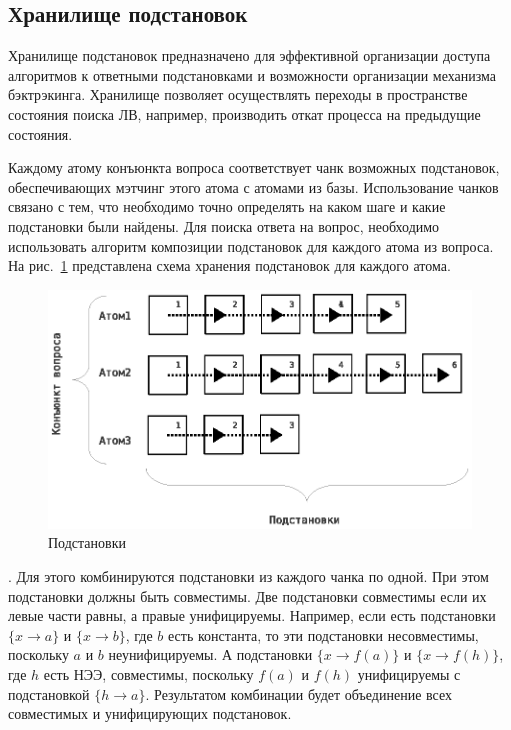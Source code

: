 \subsection{Хранилище подстановок}
Хранилище подстановок предназначено для эффективной организации доступа алгоритмов к ответными подстановками и возможности организации механизма бэктрэкинга. Хранилище позволяет осуществлять переходы в пространстве состояния поиска ЛВ, например, производить откат процесса на предыдущие состояния.

Каждому атому конъюнкта вопроса соответствует чанк возможных подстановок, обеспечивающих мэтчинг этого атома с атомами из базы. Использование чанков связано с тем, что необходимо точно определять на каком шаге и какие подстановки были найдены. Для поиска ответа на вопрос, необходимо использовать алгоритм композиции подстановок для каждого атома из вопроса. На рис.~\ref{fig:anbase} представлена схема хранения подстановок для каждого атома.
\begin{figure}[h]
  \centering
  \includegraphics[width=0.6\linewidth]{pics/AnBase.eps}
  \caption{Подстановки}
  \label{fig:anbase}
\end{figure}

. Для этого комбинируются подстановки из каждого чанка по одной. При этом подстановки должны быть совместимы. Две подстановки совместимы если их левые части равны, а правые унифицируемы. Например, если есть подстановки $\{x \rightarrow a\}$ и $\{x \rightarrow b\}$, где $b$ есть константа, то эти подстановки несовместимы, поскольку $a$ и $b$ неунифицируемы. А подстановки $\{x \rightarrow f(a)\}$ и $\{x \rightarrow f(h)\}$, где $h$ есть НЭЭ, совместимы, поскольку $f(a)$ и $f(h)$ унифицируемы с подстановкой $\{h \rightarrow a\}$. Результатом комбинации будет объединение всех совместимых и унифицирующих подстановок.

